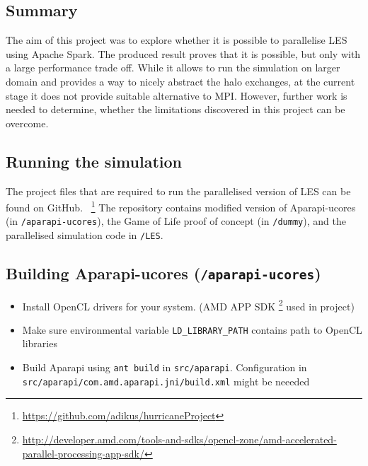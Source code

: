 \documentclass{l4proj}
\begin{document}
\section{Summary}

The aim of this project was to explore whether it is possible to parallelise 
LES using Apache Spark. The produced result proves that it is possible, but only 
with a large performance trade off. While it allows to run the simulation on larger
domain and provides a way to nicely abstract the halo exchanges, at the current stage
it does not provide suitable alternative to MPI. However, further work is needed
to determine, whether the limitations discovered in this project can be overcome.

\begin{appendices}

\chapter{Running the simulation}
\label{chap:running}

The project files that are required to run the parallelised version of LES can be found on GitHub.
~\footnote{\url{https://github.com/adikus/hurricaneProject}}
The repository contains modified version of Aparapi-ucores (in \texttt{/aparapi-ucores}), 
the Game of Life proof of concept (in \texttt{/dummy}),
and the parallelised simulation code in \texttt{/LES}.

\section{Building Aparapi-ucores (\texttt{/aparapi-ucores})}

\begin{itemize}
\item Install OpenCL drivers for your system. (AMD APP SDK
\footnote{\url{http://developer.amd.com/tools-and-sdks/opencl-zone/amd-accelerated-parallel-processing-app-sdk/}} 
used in project)
\item Make sure environmental variable \texttt{LD\_LIBRARY\_PATH} contains path to OpenCL libraries
\item Build Aparapi using \texttt{ant build} in \texttt{src/aparapi}. Configuration in \\
\texttt{src/aparapi/com.amd.aparapi.jni/build.xml} might be neeeded
\end{itemize}


\end{appendices}
\end{document}
